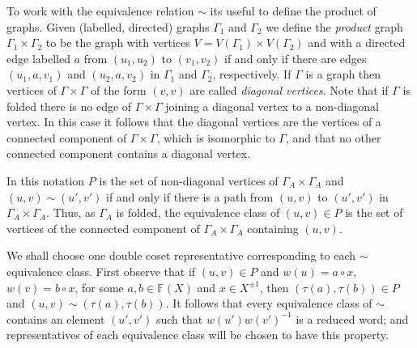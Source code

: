 \documentclass[a4paper,12pt]{article}
\newcommand{\G}{\Gamma }
\renewcommand{\t}{\tau }
\numberwithin{equation}{section}
\numberwithin{figure}{section}
\newcommand{\FF}{\ensuremath{\mathbb{F}}}
\begin{document}

To work with the equivalence relation $\sim$ its useful to define
the product of graphs. Given (labelled, directed)
graphs $\G_1$ and $\G_2$ we define the {\em
product} graph $\G_1\times \G_2$ to be the graph with vertices
$V=V(\G_1)\times V(\G_2)$ and with a directed edge labelled $a$
from $(u_1,u_2)$ to $(v_1,v_2)$ if and only if there are edges
$(u_1,a, v_1)$ and $(u_2,a,v_2)$ in $\G_1$ and $\G_2$,
respectively. If $\G$ is a graph then
vertices of $\G\times \G$ of
 the form $(v,v)$ are called {\em diagonal vertices}.
Note that if $\G$ is folded there is no edge of $\G\times \G$
joining a diagonal vertex to a non-diagonal vertex. In this case
it follows that the diagonal vertices are the vertices of a
connected component of $\G\times \G$, which is isomorphic to $\G$,
and that no other connected component contains a diagonal vertex.

In this notation $P$ is the set of non-diagonal vertices of
$\G_A\times \G_A$ and $(u,v)\sim (u',v')$ if and only if there is
a path from $(u,v)$ to $(u',v')$ in $\G_A\times \G_A$.
 Thus, as $\G_A$ is folded, the equivalence class of $(u,v)\in P$
is the set of vertices of the connected component of $\G_A\times \G_A$
containing $(u,v)$.

We shall choose one double coset representative corresponding to
each $\sim$ equivalence class. First observe that if
$(u,v)\in P$ and $w(u)=a\circ x$, $w(v)=b\circ x$, for some
$a,b\in \FF(X)$ and $x\in X^{\pm 1}$, then $(\t(a),\t(b))\in P$ and
$(u,v)\sim (\t(a),\t(b))$. It follows that every equivalence  class
of $\sim$ contains an element $(u',v')$ such that
$w(u')w(v')^{-1}$ is a reduced word; and representatives of each
equivalence class will be chosen to have this property.
\end{document}

